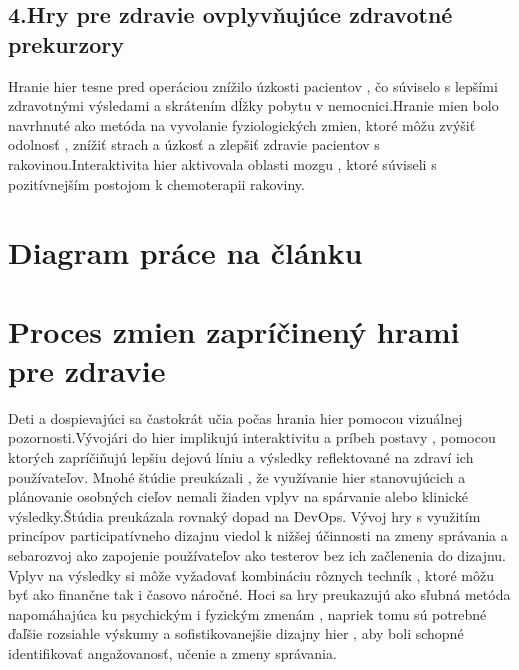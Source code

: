 \documentclass[10pt,oneside,slovak,a4paper]{article}
\begin{document}
\subsection{4.Hry pre zdravie ovplyvňujúce zdravotné prekurzory}
Hranie hier tesne pred operáciou znížilo úzkosti pacientov , čo súviselo s lepšími zdravotnými výsledami a skrátením dĺžky pobytu v nemocnici.Hranie mien bolo navrhnuté ako metóda na vyvolanie fyziologických zmien, ktoré môžu zvýšiť odolnosť , znížiť strach a úzkosť a zlepšiť zdravie pacientov s rakovinou.Interaktivita hier aktivovala oblasti mozgu , ktoré súviseli s pozitívnejším postojom k chemoterapii rakoviny.
\section{Diagram práce na článku}

\section{Proces zmien zapríčinený hrami pre zdravie}
Deti a dospievajúci sa častokrát učia počas hrania hier pomocou vizuálnej pozornosti.Vývojári do hier implikujú interaktivitu a príbeh postavy , pomocou ktorých zapríčiňujú lepšiu dejovú líniu a výsledky reflektované na zdraví ich používateľov. Mnohé štúdie preukázali , že využívanie hier stanovujúcich a plánovanie osobných cieľov nemali žiaden vplyv na spárvanie alebo klinické výsledky.Štúdia preukázala rovnaký dopad na DevOps. Vývoj hry s využitím princípov \cite{Coplien:MPD}participatívneho dizajnu viedol k nižšej účinnosti na zmeny správania a sebarozvoj ako zapojenie používateľov ako testerov bez ich začlenenia do dizajnu. Vplyv na výsledky si môže vyžadovať kombináciu rôznych techník , ktoré môžu byť ako finančne tak i časovo náročné. Hoci sa hry preukazujú ako sľubná metóda napomáhajúca ku psychickým i fyzickým zmenám , napriek tomu sú potrebné ďaľšie rozsiahle výskumy a sofistikovanejšie dizajny hier , aby boli schopné identifikovať angažovanosť, učenie a zmeny správania. 
\end{document}
